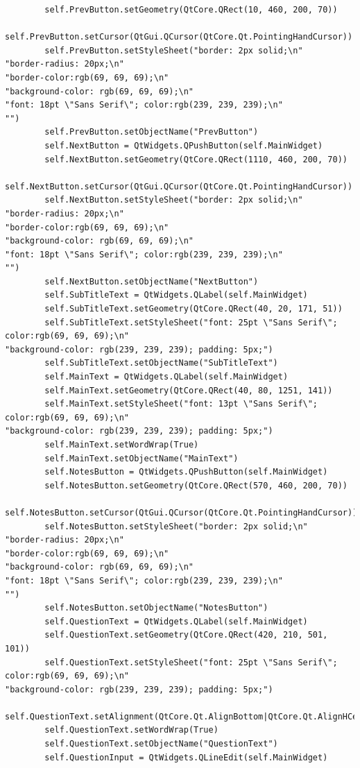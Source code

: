 \documentclass[12pt]{article}
\begin{document}
\begin{lstlisting}
        self.PrevButton.setGeometry(QtCore.QRect(10, 460, 200, 70))
        self.PrevButton.setCursor(QtGui.QCursor(QtCore.Qt.PointingHandCursor))
        self.PrevButton.setStyleSheet("border: 2px solid;\n"
"border-radius: 20px;\n"
"border-color:rgb(69, 69, 69);\n"
"background-color: rgb(69, 69, 69);\n"
"font: 18pt \"Sans Serif\"; color:rgb(239, 239, 239);\n"
"")
        self.PrevButton.setObjectName("PrevButton")
        self.NextButton = QtWidgets.QPushButton(self.MainWidget)
        self.NextButton.setGeometry(QtCore.QRect(1110, 460, 200, 70))
        self.NextButton.setCursor(QtGui.QCursor(QtCore.Qt.PointingHandCursor))
        self.NextButton.setStyleSheet("border: 2px solid;\n"
"border-radius: 20px;\n"
"border-color:rgb(69, 69, 69);\n"
"background-color: rgb(69, 69, 69);\n"
"font: 18pt \"Sans Serif\"; color:rgb(239, 239, 239);\n"
"")
        self.NextButton.setObjectName("NextButton")
        self.SubTitleText = QtWidgets.QLabel(self.MainWidget)
        self.SubTitleText.setGeometry(QtCore.QRect(40, 20, 171, 51))
        self.SubTitleText.setStyleSheet("font: 25pt \"Sans Serif\"; color:rgb(69, 69, 69);\n"
"background-color: rgb(239, 239, 239); padding: 5px;")
        self.SubTitleText.setObjectName("SubTitleText")
        self.MainText = QtWidgets.QLabel(self.MainWidget)
        self.MainText.setGeometry(QtCore.QRect(40, 80, 1251, 141))
        self.MainText.setStyleSheet("font: 13pt \"Sans Serif\"; color:rgb(69, 69, 69);\n"
"background-color: rgb(239, 239, 239); padding: 5px;")
        self.MainText.setWordWrap(True)
        self.MainText.setObjectName("MainText")
        self.NotesButton = QtWidgets.QPushButton(self.MainWidget)
        self.NotesButton.setGeometry(QtCore.QRect(570, 460, 200, 70))
        self.NotesButton.setCursor(QtGui.QCursor(QtCore.Qt.PointingHandCursor))
        self.NotesButton.setStyleSheet("border: 2px solid;\n"
"border-radius: 20px;\n"
"border-color:rgb(69, 69, 69);\n"
"background-color: rgb(69, 69, 69);\n"
"font: 18pt \"Sans Serif\"; color:rgb(239, 239, 239);\n"
"")
        self.NotesButton.setObjectName("NotesButton")
        self.QuestionText = QtWidgets.QLabel(self.MainWidget)
        self.QuestionText.setGeometry(QtCore.QRect(420, 210, 501, 101))
        self.QuestionText.setStyleSheet("font: 25pt \"Sans Serif\"; color:rgb(69, 69, 69);\n"
"background-color: rgb(239, 239, 239); padding: 5px;")
        self.QuestionText.setAlignment(QtCore.Qt.AlignBottom|QtCore.Qt.AlignHCenter)
        self.QuestionText.setWordWrap(True)
        self.QuestionText.setObjectName("QuestionText")
        self.QuestionInput = QtWidgets.QLineEdit(self.MainWidget)

\end{lstlisting}
\end{document}

